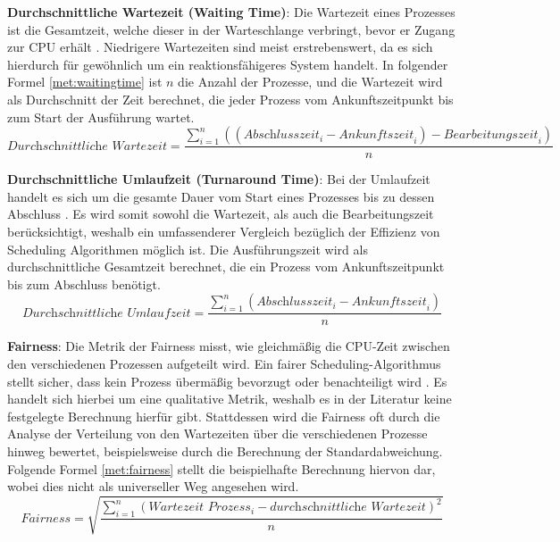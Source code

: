 \textbf{Durchschnittliche Wartezeit (Waiting Time)}: Die Wartezeit eines Prozesses ist die Gesamtzeit, welche dieser in der Warteschlange verbringt, bevor er Zugang zur \ac{CPU} erhält  \autocite{pemasinghe_comparison_2022}. Niedrigere Wartezeiten sind meist erstrebenswert, da es sich hierdurch für gewöhnlich um ein reaktionsfähigeres System handelt. In folgender Formel \ref{met:waitingtime} ist \( n \) die Anzahl der Prozesse, und die Wartezeit wird als Durchschnitt der Zeit berechnet, die jeder Prozess vom Ankunftszeitpunkt bis zum Start der Ausführung wartet.
\begin{equation}
\textit{Durchschnittliche Wartezeit} = \frac{\sum_{i=1}^{n} ((\textit{Abschlusszeit}_{i} - \textit{Ankunftszeit}_{i}) - \textit{Bearbeitungszeit}_{i})}{n}
\label{met:waitingtime}
\end{equation}


\textbf{Durchschnittliche Umlaufzeit (Turnaround Time)}: Bei der Umlaufzeit handelt es sich um die gesamte Dauer vom Start eines Prozesses bis zu dessen Abschluss \autocite{pemasinghe_comparison_2022}. Es wird somit sowohl die Wartezeit, als auch die Bearbeitungszeit berücksichtigt, weshalb ein umfassenderer Vergleich bezüglich der Effizienz von Scheduling Algorithmen möglich ist. Die Ausführungszeit wird als durchschnittliche Gesamtzeit berechnet, die ein Prozess vom Ankunftszeitpunkt bis zum Abschluss benötigt.
\begin{equation}
	\textit{Durchschnittliche Umlaufzeit} = \frac{\sum_{i=1}^{n} (\textit{Abschlusszeit}_{i} - \textit{Ankunftszeit}_{i})}{n}
	\label{met:turnaroundtime}
\end{equation}


\textbf{Fairness}: Die Metrik der Fairness misst, wie gleichmäßig die \ac{CPU}-Zeit zwischen den verschiedenen Prozessen aufgeteilt wird. Ein fairer Scheduling-Algorithmus stellt sicher, dass kein Prozess übermäßig bevorzugt oder benachteiligt wird \autocite{haldar_fairness_1991}. Es handelt sich hierbei um eine qualitative Metrik, weshalb es in der Literatur keine festgelegte Berechnung hierfür gibt. Stattdessen wird die Fairness oft durch die Analyse der Verteilung von den Wartezeiten über die verschiedenen Prozesse hinweg bewertet, beispielsweise durch die Berechnung der Standardabweichung. Folgende Formel \ref{met:fairness} stellt die beispielhafte Berechnung hiervon dar, wobei dies nicht als universeller Weg angesehen wird. 
\begin{equation}
	\textit{Fairness} = \sqrt{\frac{\sum_{i=1}^{n} (\textit{Wartezeit Prozess}_{i} - \textit{durchschnittliche Wartezeit})^2}{n}}
	\label{met:fairness}
\end{equation}
